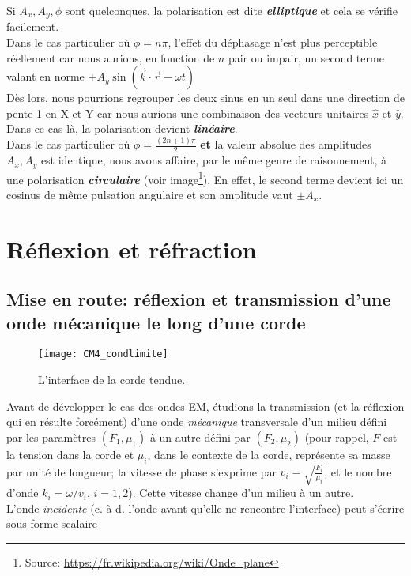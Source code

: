 Si $A_{x},A_{y}, \phi$ 
sont quelconques, la polarisation est dite
 \textit{\textbf{elliptique}}
et cela se vérifie facilement.\\
Dans le cas particulier où $\phi = n \pi$, l'effet du déphasage n'est plus perceptible réellement car nous aurions, en fonction 
de $n$ pair ou impair, un second terme valant en norme $\pm A_{y} \sin(\vec{k}\cdot \vec{r} - \omega t)$ \\
Dès lors, nous pourrions regrouper les deux sinus en un seul dans une direction de pente 1 en X et Y car nous aurions une combinaison 
des vecteurs unitaires $\hat{x}$ et $\hat{y}$. Dans ce cas-là, la polarisation devient \textit{\textbf{linéaire}}. \\
Dans le cas particulier où $\phi = \frac{(2n+1) \pi }{2}$ \textbf{et} la valeur absolue des amplitudes $A_{x}, A_{y}$ est identique, 
nous avons affaire, par le même genre de raisonnement, à une polarisation \textit{\textbf{circulaire}} (voir image\footnote{Source: \url{https://fr.wikipedia.org/wiki/Onde_plane}}). 
En effet, le second terme devient ici un cosinus de même pulsation angulaire et son amplitude vaut $\pm A_{x}$. 



\section{Réflexion et réfraction} 


\subsection{Mise en route: réflexion et transmission d'une onde mécanique le long d'une corde} 

\begin{figure*}
	\texttt{[image: CM4\_condlimite]}
	\caption{L'interface de la corde tendue.}
\end{figure*}
Avant de développer le cas des ondes EM, étudions la transmission (et la réflexion qui en résulte forcément) d'une onde \textit{mécanique} transversale d'un milieu défini par les paramètres $({F}_1,{\mu_1})$ à un autre défini par $({F}_2,{\mu_2})$ (pour rappel, $F$ est la tension dans la corde et $\mu_i$, dans le contexte de la corde, représente sa masse par unité de longueur; la vitesse de phase s'exprime par $v_i = \sqrt{\frac{F_i}{\mu_i}}$, et le nombre d'onde $k_i = \omega/v_i$, $i = 1, 2$). Cette vitesse change d'un milieu à un autre.\\
L'onde \textit{incidente} (c.-à-d. l'onde avant qu'elle ne rencontre l'interface) peut s'écrire sous forme scalaire


